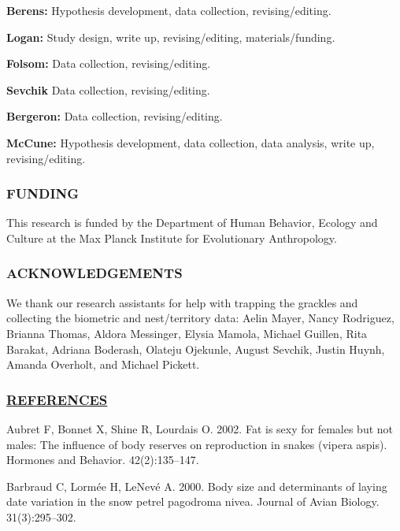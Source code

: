 \documentclass[
]{article}
\begin{document}
\textbf{Berens:} Hypothesis development, data collection,
revising/editing.

\textbf{Logan:} Study design, write up, revising/editing,
materials/funding.

\textbf{Folsom:} Data collection, revising/editing.

\textbf{Sevchik} Data collection, revising/editing.

\textbf{Bergeron:} Data collection, revising/editing.

\textbf{McCune:} Hypothesis development, data collection, data analysis,
write up, revising/editing.

\hypertarget{funding}{%
\subsubsection{FUNDING}\label{funding}}

This research is funded by the Department of Human Behavior, Ecology and
Culture at the Max Planck Institute for Evolutionary Anthropology.

\hypertarget{acknowledgements}{%
\subsubsection{ACKNOWLEDGEMENTS}\label{acknowledgements}}

We thank our research assistants for help with trapping the grackles and
collecting the biometric and nest/territory data: Aelin Mayer, Nancy
Rodriguez, Brianna Thomas, Aldora Messinger, Elysia Mamola, Michael
Guillen, Rita Barakat, Adriana Boderash, Olateju Ojekunle, August
Sevchik, Justin Huynh, Amanda Overholt, and Michael Pickett.

\hypertarget{references}{%
\subsubsection*{\texorpdfstring{\href{MyLibrary.bib}{REFERENCES}}{REFERENCES}}\label{references}}

\hypertarget{refs}{}
\leavevmode\hypertarget{ref-aubret2002fat}{}%
Aubret F, Bonnet X, Shine R, Lourdais O. 2002. Fat is sexy for females
but not males: The influence of body reserves on reproduction in snakes
(vipera aspis). Hormones and Behavior. 42(2):135--147.

\leavevmode\hypertarget{ref-barbraud2000body}{}%
Barbraud C, Lormée H, LeNevé A. 2000. Body size and determinants of
laying date variation in the snow petrel pagodroma nivea. Journal of
Avian Biology. 31(3):295--302.
\end{document}
